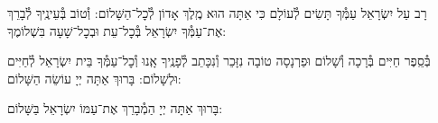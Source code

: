 \documentclass[twoside, openany, parskip=half, 11pt]{book}
\begin{document}
\maarivmodim

\alhanisim

\weekdaysahodos

רָב עַל יִשְׂרָאֵל עַמְּ֯ךָ תָּשִׂים לְ֯עוֹלָם כִּי אַתָּה הוּא מֶֽלֶךְ אָדוֹן לְ֯כׇל־הַשָּׁלוֹם: וְ֯טוֹב בְּ֯עֵינֶֽיךָ לְ֯בָרֵךְ אֶת־עַמְּ֯ךָ יִשְׂרָאֵל בְּ֯כׇל־עֵת וּבְכׇל־שָׁעָה בִּשְׁלוֹמֶךָ:
\vspace{-0.4\baselineskip}
\begin{paracol}{2}

\begin{small}
בְּ֯סֵֽפֶר חַיִּים בְּ֯רָכָה וְ֯שָׁלוֹם וּפַרְנָסָה טוֹבָה נִזָּכֵר וְ֯נִכָּתֵב לְ֯פָנֶֽיךָ אָֽנוּ וְ֯כׇל־עַמְּ֯ךָ בֵּית יִשְׂרָאֵל לְ֯חַיִּים וּלְשָׁלוֹם: בָּרוּךְ אַתָּה יְיָ עוֹשֵׂה הַשָּׁלוֹם:

\end{small}
\switchcolumn
בָּרוּךְ אַתָּה יְיָ הַמְ֯בָרֵךְ אֶת־עַמּוֹ יִשְׂרָאֵל בַּשָּׁלוֹם:

\end{paracol}



\tachanunim

\vspace{\baselineskip}
\halfkaddish
\end{document}
